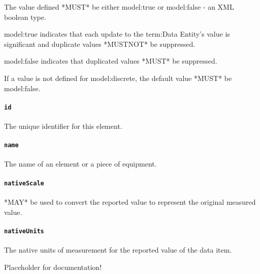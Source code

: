  The value defined *MUST* be either {model:true} or {model:false} - an XML boolean type.
  
 {model:true} indicates that each update to the {term:Data Entity}'s value is significant and duplicate values *MUSTNOT* be suppressed.
  
 {model:false} indicates that duplicated values *MUST* be suppressed.
  
 If a value is not defined for {model:discrete}, the default value *MUST* be {model:false}.

\paragraph{\texttt{id}}\mbox{}
\newline\tab The unique identifier for this element.

\paragraph{\texttt{name}}\mbox{}
\newline\tab The name of an element or a piece of equipment.

\paragraph{\texttt{nativeScale}}\mbox{}
\newline{} *MAY* be used to convert the reported value to represent the original measured value.

\paragraph{\texttt{nativeUnits}}\mbox{}
\newline\tab The native units of measurement for the reported value of the data item.

Placeholder for documentation!

